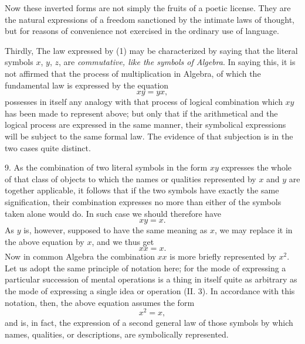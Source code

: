 \documentclass[oneside]{book}
\begin{document}
Now these inverted forms are not simply the fruits of a poetic
license. They are the natural expressions of a freedom sanctioned
by the intimate laws of thought, but for reasons of convenience
not exercised in the ordinary use of language.

Thirdly, The law expressed by (1) may be characterized by
saying that the literal symbols $x$, $y$, $z$, are \textit{commutative, like the
symbols of Algebra}. In saying this, it is not affirmed that the
process of multiplication in Algebra, of which the fundamental
law is expressed by the equation
\[
xy = yx,
\]
possesses in itself any analogy with that process of logical combination
which $xy$ has been made to represent above; but only
that if the arithmetical and the logical process are expressed in
the same manner, their symbolical expressions will be subject to
the same formal law. The evidence of that subjection is in the
two cases quite distinct.

9. As the combination of two literal symbols in the form $xy$
expresses the whole of that class of objects to which the names
or qualities represented by $x$ and $y$ are together applicable, it
follows that if the two symbols have exactly the same signification,
their combination expresses no more than either of the
symbols taken alone would do. In such case we should therefore
have
\[
xy = x.
\]
As $y$ is, however, supposed to have the same meaning as $x$, we
may replace it in the above equation by $x$, and we thus get
\[
xx = x.
\]
Now in common Algebra the combination $xx$ is more briefly represented
by $x^2$. Let us adopt the same principle of notation
here; for the mode of expressing a particular succession of mental
operations is a thing in itself quite as arbitrary as the mode of
expressing a single idea or operation (II. 3). In accordance with
this notation, then, the above equation assumes the form
\begin{equation}
x^2 = x,
\end{equation}
and is, in fact, the expression of a second general law of those
symbols by which names, qualities, or descriptions, are symbolically
represented.
\end{document}
